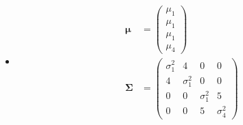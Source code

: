 \documentclass[letter, 11pt]{article}
\newcommand{\bo}[1]{\boldsymbol#1}
\begin{document}
\begin{enumerate}[leftmargin=*, wide, label=\bf Exercice \arabic*:]
{\begin{itemize}
\begin{align*}
\begin{pmatrix}
            0 & \sigma_2^2 & \cdots & 0 & 0 \\[4mm]
            \vdots & & \ddots & & \vdots \\[4mm]
            0 & 0 & \cdots & 0 & \sigma_n^2
        \end{pmatrix} 
    \end{align*}
    \item[(d)] \begin{align*}
        \bo\mu
        &= \begin{pmatrix}
            \mu_1 \\[4mm]
            \mu_1 \\[4mm]
            \mu_1 \\[4mm]
            \mu_4
        \end{pmatrix}\\
        \bo\Sigma
        &=  \begin{pmatrix}
            \sigma_1^2 & 4 & 0 & 0 \\[4mm]
            4 & \sigma_1^2 & 0 & 0 \\[4mm]
            0 & 0 & \sigma_1^2 & 5 \\[4mm]
            0 & 0 & 5 & \sigma_4^2
        \end{pmatrix} 
    \end{align*}
\end{itemize}
}

\end{enumerate}
\end{document}
